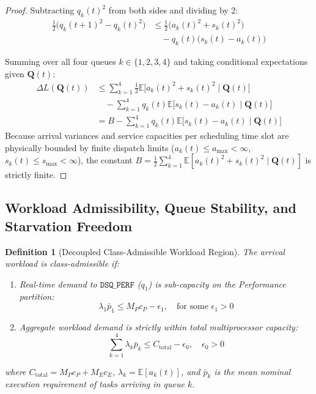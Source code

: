 \documentclass[conference]{IEEEtran}
\newtheorem{definition}{Definition}
\begin{document}
\begin{proof}
Subtracting $q_k(t)^2$ from both sides and dividing by 2:
\begin{align}
\frac{1}{2} \Big( q_k(t+1)^2 - q_k(t)^2 \Big) &\le \frac{1}{2}\big( a_k(t)^2 + s_k(t)^2 \big) \nonumber \\
&\quad - q_k(t)\big( s_k(t) - a_k(t) \big)
\end{align}

Summing over all four queues $k \in \{1, 2, 3, 4\}$ and taking conditional expectations given $\mathbf{Q}(t)$:
\begin{align}
\Delta L(\mathbf{Q}(t)) &\le \sum_{k=1}^4 \frac{1}{2}\mathbb{E}\big[ a_k(t)^2 + s_k(t)^2 \mid \mathbf{Q}(t) \big] \nonumber \\
&\quad - \sum_{k=1}^4 q_k(t) \mathbb{E}\big[ s_k(t) - a_k(t) \mid \mathbf{Q}(t) \big] \nonumber \\
&= B - \sum_{k=1}^4 q_k(t) \mathbb{E}\big[ s_k(t) - a_k(t) \mid \mathbf{Q}(t) \big]
\end{align}
Because arrival variances and service capacities per scheduling time slot are physically bounded by finite dispatch limits ($a_k(t) \le a_{\max} < \infty$, $s_k(t) \le s_{\max} < \infty$), the constant $B = \frac{1}{2}\sum_{k=1}^4 \mathbb{E}[a_k(t)^2 + s_k(t)^2 \mid \mathbf{Q}(t)]$ is strictly finite.
\end{proof}

\subsection{Workload Admissibility, Queue Stability, and Starvation Freedom}

\begin{definition}[Decoupled Class-Admissible Workload Region]
\label{def:class_admissible}
The arrival workload is class-admissible if:
\begin{enumerate}
    \item Real-time demand to $\texttt{DSQ\_PERF}$ ($q_1$) is sub-capacity on the Performance partition:
    \begin{equation}
    \lambda_1 \bar{p}_1 \le M_P c_P - \epsilon_1, \quad \text{for some } \epsilon_1 > 0
    \end{equation}
    \item Aggregate workload demand is strictly within total multiprocessor capacity:
    \begin{equation}
    \label{eq:capacity_constraint}
    \sum_{k=1}^4 \lambda_k \bar{p}_k \le C_{\mathrm{total}} - \epsilon_0, \quad \epsilon_0 > 0
    \end{equation}
\end{enumerate}
where $C_{\mathrm{total}} = M_P c_P + M_E c_E$, $\lambda_k = \mathbb{E}[a_k(t)]$, and $\bar{p}_k$ is the mean nominal execution requirement of tasks arriving in queue $k$.
\end{definition}
\end{document}
